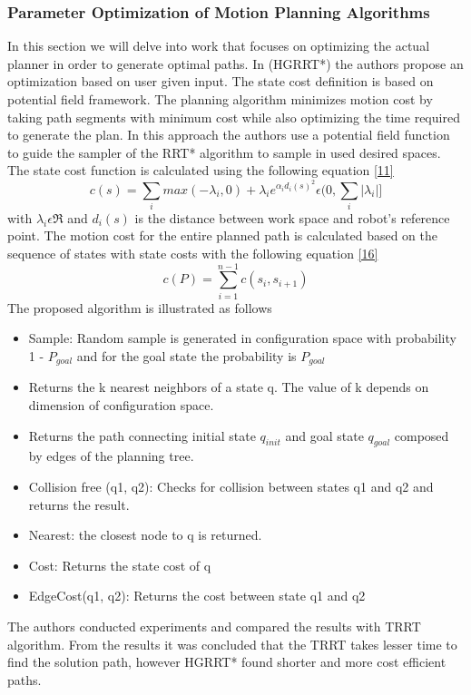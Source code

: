\subsubsection{Parameter Optimization of Motion Planning Algorithms}
In this section we will delve into work that focuses on optimizing the actual planner in order to generate optimal paths. In \cite{11}(HGRRT*) the authors propose an optimization based on user given input. The state cost definition is based on potential field framework. The planning algorithm minimizes motion cost by taking path segments with minimum cost while also optimizing the time required to generate the plan. In this approach the authors use a potential field function to guide the sampler of the RRT* algorithm to sample in used desired spaces. The state cost function is calculated using the following equation \eqref{11}
\begin{equation}
\label{16}
c(s) = \sum_{i} max(-\lambda_{i},0 ) + \lambda_{i}e^{\alpha_{i}d_{i}(s)^2} \epsilon (0,\sum_{i}|\lambda_{i}|]
\end{equation}
with $\lambda_{i} \epsilon \Re$ and $d_{i}(s)$ is the distance between work space and robot's reference point. The motion cost for the entire planned path is calculated based on the sequence of states with state costs with the following equation \eqref{16}
\begin{equation}
\label{17}
c(P) = \sum_{i=1}^{n-1}c(s_{i},s_{i+1})
\end{equation}
The proposed algorithm is illustrated as follows
\begin{itemize}
\item Sample: Random sample is generated in configuration space with probability 1 - $P_{goal}$ and for the goal state the probability is $P_{goal}$
\item Returns the k nearest neighbors of a state q. The value of k depends on dimension of configuration space.
\item Returns the path connecting initial state $q_{init}$ and goal state $q_{goal}$ composed by edges of the planning tree.
\item Collision free (q1, q2): Checks for collision between states q1 and q2 and returns the result.
\item Nearest: the closest node to q is returned. 
\item Cost: Returns the state cost of q
\item EdgeCost(q1, q2): Returns the cost between state q1 and q2
\end{itemize}
The authors conducted experiments and compared the results with TRRT algorithm. From the results it was concluded that the TRRT takes lesser time to find the solution path, however HGRRT* found shorter and more cost efficient paths. \\
